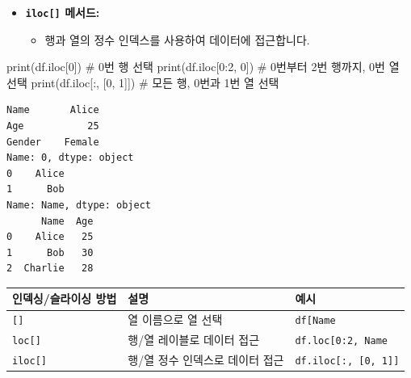 \documentclass[
  letterpaper,
]{book}
\newenvironment{Shaded}{\begin{snugshade}}{\end{snugshade}}
\newcommand{\BuiltInTok}[1]{\textcolor[rgb]{0.00,0.23,0.31}{#1}}
\newcommand{\CommentTok}[1]{\textcolor[rgb]{0.37,0.37,0.37}{#1}}
\newcommand{\DecValTok}[1]{\textcolor[rgb]{0.68,0.00,0.00}{#1}}
\newcommand{\NormalTok}[1]{\textcolor[rgb]{0.00,0.23,0.31}{#1}}
\providecommand{\tightlist}{%
  \setlength{\itemsep}{0pt}\setlength{\parskip}{0pt}}
\begin{document}
\begin{itemize}
\item
  \textbf{\texttt{iloc{[}{]}} 메서드:}

  \begin{itemize}
  \tightlist
  \item
    행과 열의 정수 인덱스를 사용하여 데이터에 접근합니다.
  \end{itemize}
\end{itemize}

\begin{Shaded}
\begin{Highlighting}[]
    \BuiltInTok{print}\NormalTok{(df.iloc[}\DecValTok{0}\NormalTok{]) }\CommentTok{\# 0번 행 선택}
    \BuiltInTok{print}\NormalTok{(df.iloc[}\DecValTok{0}\NormalTok{:}\DecValTok{2}\NormalTok{, }\DecValTok{0}\NormalTok{]) }\CommentTok{\# 0번부터 2번 행까지, 0번 열 선택}
    \BuiltInTok{print}\NormalTok{(df.iloc[:, [}\DecValTok{0}\NormalTok{, }\DecValTok{1}\NormalTok{]]) }\CommentTok{\# 모든 행, 0번과 1번 열 선택}
\end{Highlighting}
\end{Shaded}

\begin{verbatim}
Name       Alice
Age           25
Gender    Female
Name: 0, dtype: object
0    Alice
1      Bob
Name: Name, dtype: object
      Name  Age
0    Alice   25
1      Bob   30
2  Charlie   28
\end{verbatim}

\begin{longtable}[]{@{}
  >{\centering\arraybackslash}p{}
  >{\centering\arraybackslash}p{}
  >{\centering\arraybackslash}p{}@{}}
\toprule\noalign{}
\begin{minipage}[b]{\linewidth}\centering
인덱싱/슬라이싱 방법
\end{minipage} & \begin{minipage}[b]{\linewidth}\centering
설명
\end{minipage} & \begin{minipage}[b]{\linewidth}\centering
예시
\end{minipage} \\
\midrule\noalign{}
\endhead
\bottomrule\noalign{}
\endlastfoot
\texttt{{[}{]}} & 열 이름으로 열 선택 &
\texttt{df{[}\textquotesingle{}Name\textquotesingle{}{]}} \\
\texttt{loc{[}{]}} & 행/열 레이블로 데이터 접근 &
\texttt{df.loc{[}0:2,\ \textquotesingle{}Name\textquotesingle{}{]}} \\
\texttt{iloc{[}{]}} & 행/열 정수 인덱스로 데이터 접근 &
\texttt{df.iloc{[}:,\ {[}0,\ 1{]}{]}} \\
\end{longtable}
\end{document}
